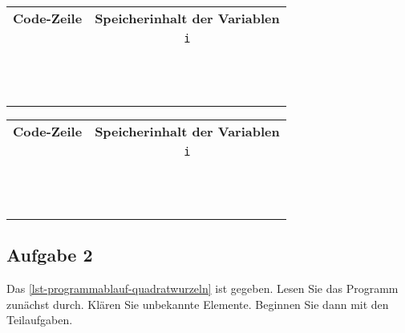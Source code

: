 \begin{table}[htb]
\centering
\begin{minipage}{0.45\textwidth}
\begin{tabular}{cc}
\toprule
\textbf{Code-Zeile} & \textbf{Speicherinhalt der Variablen} \\
			   & \lstinline[]$i$ \\
\midrule
& \\ \hline
& \\ \hline
& \\ \hline
& \\ \hline
& \\ \hline
& \\ \hline
& \\ \hline
& \\ \hline
& \\ \hline
& \\ \hline
& \\ \hline
& \\
\bottomrule
\end{tabular}
\end{minipage}
\hfill
\begin{minipage}{0.45\textwidth}
\begin{tabular}{cc}
\toprule
\textbf{Code-Zeile} & \textbf{Speicherinhalt der Variablen} \\
			   & \lstinline[]$i$ \\
\midrule
& \\ \hline
& \\ \hline
& \\ \hline
& \\ \hline
& \\ \hline
& \\ \hline
& \\ \hline
& \\ \hline
& \\ \hline
& \\ \hline
& \\ \hline
& \\
\bottomrule
\end{tabular}
\end{minipage}
\end{table}

\subsection{Aufgabe 2}

Das \autoref{lst-programmablauf-quadratwurzeln} ist gegeben. Lesen Sie das Programm zunächst durch. Klären Sie unbekannte Elemente.  Beginnen Sie dann mit den Teilaufgaben.

